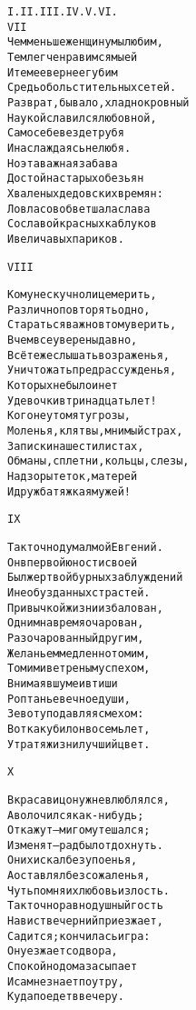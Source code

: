 \begin{minipage}[t]{\dimexpr 0.5\textwidth -\tabcolsep-.5pt}
\begin{alltt}\normalfont\centering
I. II. III. IV. V. VI.
VII
Чем меньше женщину мы любим,
Тем легче нравимся мы ей
И тем ее вернее губим
Средь обольстительных сетей.
Разврат, бывало, хладнокровный
Наукой славился любовной,
Сам о себе везде трубя
И наслаждаясь не любя.
Но эта важная забава
Достойна старых обезьян
Хваленых дедовских времян:
Ловласов обветшала слава
Со славой красных каблуков
И величавых париков.
\end{alltt}
\end{minipage}

\begin{minipage}[t]{\dimexpr 0.5\textwidth -\tabcolsep-.5pt}
\begin{alltt}\normalfont\centering
VIII

Кому не скучно лицемерить,
Различно повторять одно,
Стараться важно в том уверить,
В чем все уверены давно,
Всё те же слышать возраженья,
Уничтожать предрассужденья,
Которых не было и нет
У девочки в тринадцать лет!
Кого не утомят угрозы,
Моленья, клятвы, мнимый страх,
Записки на шести листах,
Обманы, сплетни, кольцы, слезы,
Надзоры теток, матерей
И дружба тяжкая мужей!
\end{alltt}
\end{minipage}
\clearpage

\begin{minipage}[t]{\dimexpr 0.5\textwidth -\tabcolsep-.5pt}
\begin{alltt}\normalfont\centering
IX

Так точно думал мой Евгений.
Он в первой юности своей
Был жертвой бурных заблуждений
И необузданных страстей.
Привычкой жизни избалован,
Одним на время очарован,
Разочарованный другим,
Желаньем медленно томим,
Томим и ветреным успехом,
Внимая в шуме и в тиши
Роптанье вечное души,
Зевоту подавляя смехом:
Вот как убил он восемь лет,
Утратя жизни лучший цвет.
\end{alltt}
\end{minipage}

\begin{minipage}[t]{\dimexpr 0.5\textwidth -\tabcolsep-.5pt}
\begin{alltt}\normalfont\centering
X

В красавиц он уж не влюблялся,
А волочился как-нибудь;
Откажут — мигом утешался;
Изменят — рад был отдохнуть.
Он их искал без упоенья,
А оставлял без сожаленья,
Чуть помня их любовь и злость.
Так точно равнодушный гость
На вист вечерний приезжает,
Садится; кончилась игра:
Он уезжает со двора,
Спокойно дома засыпает
И сам не знает поутру,
Куда поедет ввечеру.
\end{alltt}
\end{minipage}
\clearpage

